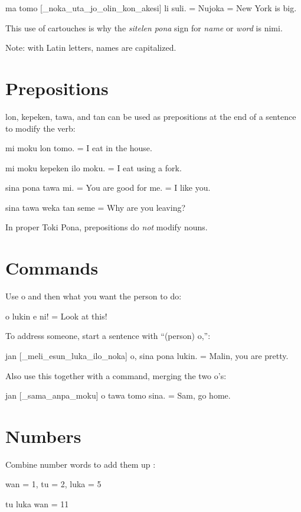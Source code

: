 \documentclass{article}
\begin{document}
\begin{multicols}{2}
\begin{ex}
  {\tpf ma tomo [\_noka\_uta\_jo\_olin\_kon\_akesi] li suli}.
  = Nujoka = New York is big.
\end{ex}

This use of cartouches is why the \textit{sitelen pona} sign for
\textit{name} or \textit{word} is {\tpf nimi}.

Note: with Latin letters, names are capitalized.

\section*{Prepositions}
{\tpf lon, kepeken, tawa}, and {\tpf tan}
can be used as prepositions at the end of a sentence
to modify the verb:
\begin{ex}
  {\tpf mi moku lon tomo.} = I eat in the house.

  {\tpf mi moku kepeken ilo moku.} = I eat using a fork.

  {\tpf sina pona tawa mi.} = You are good for me. = I like you.

  {\tpf sina tawa weka tan seme} = Why are you leaving?
\end{ex}

In proper Toki Pona, prepositions do \textit{not} modify nouns.

\section*{Commands}
Use {\tpf o} and then what you want the person to do:
\begin{ex}
  {\tpf o lukin e ni}! = Look at this!
\end{ex}

To address someone, start a sentence with “(person) {\tpf o},”:
\begin{ex}
  {\tpf jan [\_meli\_esun\_luka\_ilo\_noka] o, sina pona lukin.} = Malin, you are pretty.
\end{ex}

Also use this together with a command, merging the two
{\tpf o}’s:

\begin{ex}
  {\tpf jan [\_sama\_anpa\_moku] o tawa tomo sina.} = Sam, go home.
\end{ex}
\section*{Numbers}
Combine number words to add them up :
\begin{ex}
  {\tpf wan} = 1, {\tpf tu} = 2, {\tpf luka} = 5

  {\tpf tu luka wan } = 11
\end{ex}
\end{multicols}
\end{document}
